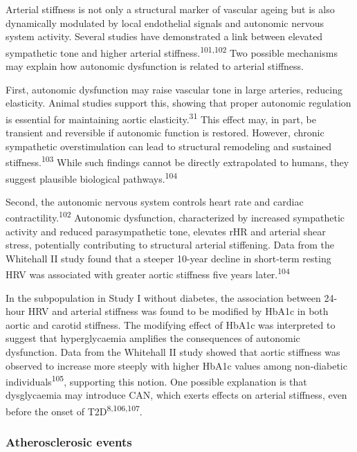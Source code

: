 \documentclass[
  a4paper,
  headsepline=true,
  open=left]{scrbook}
\begin{document}
Arterial stiffness is not only a structural marker of vascular ageing
but is also dynamically modulated by local endothelial signals and
autonomic nervous system activity. Several studies have demonstrated a
link between elevated sympathetic tone and higher arterial
stiffness.\textsuperscript{101,102} Two possible mechanisms may explain
how autonomic dysfunction is related to arterial stiffness.

First, autonomic dysfunction may raise vascular tone in large arteries,
reducing elasticity. Animal studies support this, showing that proper
autonomic regulation is essential for maintaining aortic
elasticity.\textsuperscript{31} This effect may, in part, be transient
and reversible if autonomic function is restored. However, chronic
sympathetic overstimulation can lead to structural remodeling and
sustained stiffness.\textsuperscript{103} While such findings cannot be
directly extrapolated to humans, they suggest plausible biological
pathways.\textsuperscript{104}

Second, the autonomic nervous system controls heart rate and cardiac
contractility.\textsuperscript{102} Autonomic dysfunction, characterized
by increased sympathetic activity and reduced parasympathetic tone,
elevates rHR and arterial shear stress, potentially contributing to
structural arterial stiffening. Data from the Whitehall II study found
that a steeper 10-year decline in short-term resting HRV was associated
with greater aortic stiffness five years later.\textsuperscript{104}

In the subpopulation in Study I without diabetes, the association
between 24-hour HRV and arterial stiffness was found to be modified by
HbA1c in both aortic and carotid stiffness. The modifying effect of
HbA1c was interpreted to suggest that hyperglycaemia amplifies the
consequences of autonomic dysfunction. Data from the Whitehall II study
showed that aortic stiffness was observed to increase more steeply with
higher HbA1c values among non-diabetic individuals\textsuperscript{105},
supporting this notion. One possible explanation is that dysglycaemia
may introduce CAN, which exerts effects on arterial stiffness, even
before the onset of T2D\textsuperscript{8,106,107}.

\hypertarget{atherosclerosic-events}{%
\subsubsection{Atherosclerosic events}\label{atherosclerosic-events}}
\end{document}
